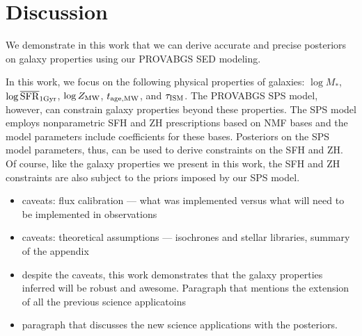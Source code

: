 \section{Discussion} \label{sec:discuss}
We demonstrate in this work that we can derive accurate and precise posteriors
on galaxy properties using our {\sc PROVABGS} SED modeling. 



In this work, we focus on the following physical properties of galaxies: 
$\log M_*$, $\log\overline{\rm SFR}_{\rm 1Gyr}$, $\log Z_{\rm MW}$, $t_{\rm age, MW}$, and $\tau_{\rm ISM}$. 
The {\sc PROVABGS} SPS model, however, can constrain galaxy properties beyond
these properties. 
The SPS model employs nonparametric SFH and ZH prescriptions based on NMF bases
and the model parameters include coefficients for these bases. 
Posteriors on the SPS model parameters, thus, can be used to derive constraints
on the SFH and ZH. 
Of course, like the galaxy properties we present in this work, the SFH and ZH
constraints are also subject to the priors imposed by our SPS model. 



\begin{itemize}
    \item caveats: flux calibration --- what was implemented versus what will
    need to be implemented in observations
    \item caveats: theoretical assumptions --- isochrones and stellar
        libraries, summary of the appendix
\end{itemize}

\begin{itemize}
\item despite the caveats, this work demonstrates that the galaxy
    properties inferred will be robust and awesome. Paragraph that mentions
    the extension of all the previous science applicatoins 
\item paragraph that discusses the new science applications with the
    posteriors. 
\end{itemize}
